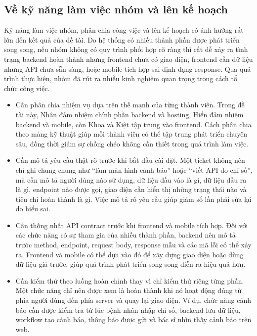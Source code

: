 \subsection{Về kỹ năng làm việc nhóm và lên kế hoạch}
\par Kỹ năng làm việc nhóm, phân chia công việc và lên kế hoạch có ảnh hưởng rất lớn đến kết quả của đề tài. Do hệ thống có nhiều thành phần được phát triển song song, nếu nhóm không có quy trình phối hợp rõ ràng thì rất dễ xảy ra tình trạng backend hoàn thành nhưng frontend chưa có giao diện, frontend cần dữ liệu nhưng API chưa sẵn sàng, hoặc mobile tích hợp sai định dạng response. Qua quá trình thực hiện, nhóm đã rút ra nhiều kinh nghiệm quan trọng trong cách tổ chức công việc.

\begin{itemize}
    \item Cần phân chia nhiệm vụ dựa trên thế mạnh của từng thành viên. Trong đề tài này, Nhân đảm nhiệm chính phần backend và hosting, Hiển đảm nhiệm backend và mobile, còn Khoa và Kiệt tập trung vào frontend. Cách phân chia theo mảng kỹ thuật giúp mỗi thành viên có thể tập trung phát triển chuyên sâu, đồng thời giảm sự chồng chéo không cần thiết trong quá trình làm việc.

    \item Cần mô tả yêu cầu thật rõ trước khi bắt đầu cài đặt. Một ticket không nên chỉ ghi chung chung như ``làm màn hình cảnh báo'' hoặc ``viết API đo chỉ số'', mà cần mô tả người dùng nào sử dụng, dữ liệu đầu vào là gì, dữ liệu đầu ra là gì, endpoint nào được gọi, giao diện cần hiển thị những trạng thái nào và tiêu chí hoàn thành là gì. Việc mô tả rõ yêu cầu giúp giảm số lần phải sửa lại do hiểu sai.

    \item Cần thống nhất API contract trước khi frontend và mobile tích hợp. Đối với các chức năng có sự tham gia của nhiều thành phần, backend nên mô tả trước method, endpoint, request body, response mẫu và các mã lỗi có thể xảy ra. Frontend và mobile có thể dựa vào đó để xây dựng giao diện hoặc dùng dữ liệu giả trước, giúp quá trình phát triển song song diễn ra hiệu quả hơn.

    \item Cần kiểm thử theo luồng hoàn chỉnh thay vì chỉ kiểm thử riêng từng phần. Một chức năng chỉ nên được xem là hoàn thành khi nó hoạt động đúng từ phía người dùng đến phía server và quay lại giao diện. Ví dụ, chức năng cảnh báo cần được kiểm tra từ lúc bệnh nhân nhập chỉ số, backend lưu dữ liệu, workflow tạo cảnh báo, thông báo được gửi và bác sĩ nhìn thấy cảnh báo trên web.


\end{itemize}
